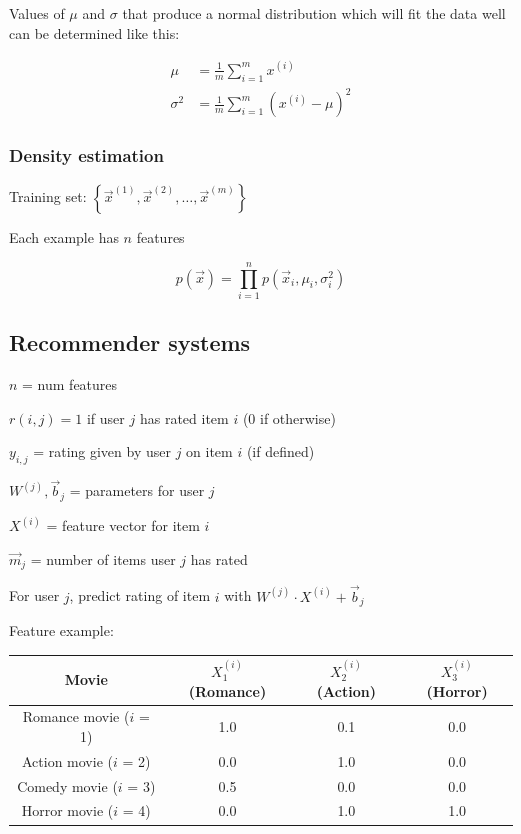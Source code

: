 \documentclass[12pt]{article}
\begin{document}
Values of $\mu$ and $\sigma$ that produce a normal distribution which will fit the data well can be determined
like this:

\begin{align*}
    \mu &= \frac{1}{m} \sum_{i=1}^m x^{(i)}\\
    \sigma^2 &= \frac{1}{m} \sum_{i=1}^m (x^{(i)} - \mu)^2
\end{align*}

\subsubsection{Density estimation}

Training set: $\left\{\vec{x}^{(1)}, \vec{x}^{(2)}, \ldots, \vec{x}^{(m)}\right\}$

Each example has $n$ features

\[ p(\vec{x}) = \prod_{i=1}^n p(\vec{x}_i,\mu_i,\sigma_i^2) \]

\subsection{Recommender systems}

$n$ = num features

$r(i,j) = 1$ if user $j$ has rated item $i$ (0 if otherwise)

$y_{i,j}$ = rating given by user $j$ on item $i$ (if defined)

$W^{(j)},\vec{b}_j$ = parameters for user $j$

$X^{(i)}$ = feature vector for item $i$

$\vec{m}_j$ = number of items user $j$ has rated

For user $j$, predict rating of item $i$ with $W^{(j)} \cdot X^{(i)} + \vec{b}_j$

Feature example:

\begin{center}
    \begin{tabular}{ ||c|c|c|c|| }
        \hline
        Movie & $X^{(i)}_1$ (Romance) & $X^{(i)}_2$ (Action) & $X^{(i)}_3$ (Horror)\\
        \hline
        Romance movie ($i$ = 1) & 1.0 & 0.1 & 0.0\\
        Action movie ($i$ = 2) & 0.0 & 1.0 & 0.0\\
        Comedy movie ($i$ = 3) & 0.5 & 0.0 & 0.0\\
        Horror movie ($i$ = 4) & 0.0 & 1.0 & 1.0\\
        \hline
    \end{tabular}
\end{center}
\end{document}
